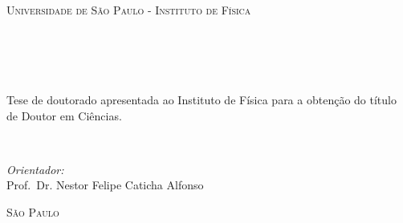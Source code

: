 \begin{titlepage}
\begin{fullwidth}
\begin{center}


\textsc{\LARGE Universidade de São Paulo - Instituto de Física}\\[3cm]

\HRule \\[0.4cm]
\textsc{\textit{\titlefont {\titletext}\\[1.0cm] \subtitlefont {\subtitletext}}}
\HRule\\[2.2cm]
\textsc{\LARGE \authorinfo }\\[1.5cm]
\hfill\begin{minipage}{0.7\textwidth}
\Large
Tese de doutorado apresentada ao Instituto de Física para a obtenção do título
de Doutor em Ciências.  
\end{minipage}\\[1.cm]
\hfill\begin{minipage}{0.7\textwidth}
\Large

\emph{Orientador:} \\
Prof.~Dr. Nestor Felipe Caticha Alfonso\\

\end{minipage}
\vfill

\textsc{\LARGE São Paulo}\\
\textsc{\LARGE \the\year}

\end{center}
\end{fullwidth}
\end{titlepage}
